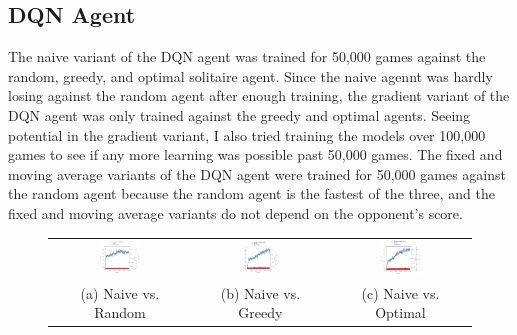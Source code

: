 \documentclass[12pt]{article}
\begin{document}
\subsection{DQN Agent}
The naive variant of the DQN agent was trained for 50,000 games against the random, greedy, and optimal solitaire agent. Since the naive agennt was hardly losing against the random agent after enough training, the gradient variant of the DQN agent was only trained against the greedy and optimal agents. Seeing potential in the gradient variant, I also tried training the models over 100,000 games to see if any more learning was possible past 50,000 games. The fixed and moving average variants of the DQN agent were trained for 50,000 games against the random agent because the random agent is the fastest of the three, and the fixed and moving average variants do not depend on the opponent's score.

\begin{figure}[H]
    \begin{tabular}{ccc}
        \includegraphics[width=0.3\textwidth]{naive_random} & 
        \includegraphics[width=0.3\textwidth]{naive_greedy} & 
        \includegraphics[width=0.3\textwidth]{naive_optimal} \\
        (a) Naive vs. Random &
        (b) Naive vs. Greedy &
        (c) Naive vs. Optimal
    \end{tabular}
\end{figure}
\end{document}
